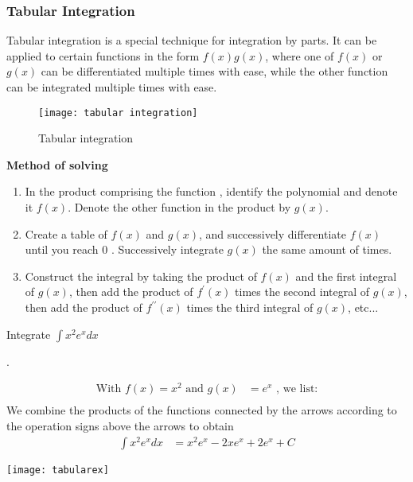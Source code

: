 \subsubsection{Tabular Integration}
\begin{minipage}{0.5\textwidth}
Tabular integration is a special technique for integration by parts. It can be applied to certain functions in the form $f(x)g(x)$, where one of $f(x)$ or $g(x)$  can be differentiated multiple times with ease, while the other function can be integrated multiple times with ease.
\end{minipage}
\begin{minipage}{0.5\textwidth}

\begin{figure}[H]
		\centering
	\texttt{[image: tabular integration]}
	\caption{Tabular integration}
\end{figure}
\end{minipage}

\textbf{Method of solving}
\begin{enumerate}
	\item In the product comprising the function , identify the polynomial and denote it $f(x)$. Denote the other function in the product by $g(x)$.
	\item Create a table of $f(x)$ and $g(x)$, and successively differentiate $f(x)$ until you reach 0 . Successively integrate $g(x)$ the same amount of times.
	\item Construct the integral by taking the product of $f(x)$ and the first integral of $g(x)$, then add the product of $f^{\prime}(x)$ times the second integral of $g(x)$, then add the product of $f^{\prime \prime}(x)$ times the third integral of $g(x)$, etc...
\end{enumerate}

{\begin{exercise}
		Integrate $\int x^{2} e^{x} d x$
	\end{exercise}
	
	\begin{answer}.\\
		\begin{minipage}{0.45\textwidth}
			\begin{align*}
			\text { With } f(x)=x^{2} \text { and } g(x)&=e^{x} \text { , we list: }\\
			\end{align*}
			We combine the products of the functions connected by the arrows according to the operation signs above the arrows to obtain	
			\begin{align*}
			\int x^{2} e^{x} d x&=x^{2} e^{x}-2 x e^{x}+2 e^{x}+C
			\end{align*}
			
			
		\end{minipage}\hspace{2.5cm}
		\begin{minipage}{0.35\textwidth}\hfill
			
			\texttt{[image: tabularex]}
		\end{minipage}
\end{answer}}


